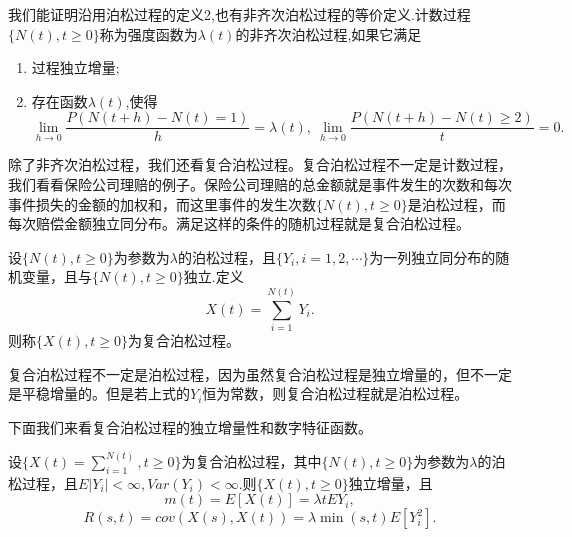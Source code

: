 \documentclass[lang=cn,10pt]{elegantbook}
\begin{document}
	\begin{definition}[非齐次泊松过程2]
		我们能证明沿用泊松过程的定义2,也有非齐次泊松过程的等价定义.计数过程\(\{N(t),t\ge0\}\)称为强度函数为\(\lambda(t)\)的非齐次泊松过程,如果它满足
		\begin{enumerate}
			\item 过程独立增量;
			\item 存在函数\(\lambda(t)\),使得
			\[\lim_{h\to 0}\frac{P(N(t+h)-N(t)=1)}{h}=\lambda(t),\ \lim_{h\to 0}\frac{P(N(t+h)-N(t)\ge 2)}{t}=0.\]
		\end{enumerate}
	\end{definition}
	除了非齐次泊松过程，我们还看复合泊松过程。复合泊松过程不一定是计数过程，我们看看保险公司理赔的例子。保险公司理赔的总金额就是事件发生的次数和每次事件损失的金额的加权和，而这里事件的发生次数\(\{N(t),t\ge 0\}\)是泊松过程，而每次赔偿金额独立同分布。满足这样的条件的随机过程就是复合泊松过程。
	\begin{definition}[复合泊松过程]
		设\(\{N(t),t\ge 0\}\)为参数为\(\lambda\)的泊松过程，且\(\{Y_i,i=1,2,\cdots\}\)为一列独立同分布的随机变量，且与\(\{N(t),t\ge 0\}\)独立.定义
		\[X(t)=\sum_{i=1}^{N(t)}Y_i.\]
		则称\(\{X(t),t\ge 0\}\)为复合泊松过程。
	\end{definition}
	\begin{note}
		复合泊松过程不一定是泊松过程，因为虽然复合泊松过程是独立增量的，但不一定是平稳增量的。但是若上式的\(Y_i\)恒为常数，则复合泊松过程就是泊松过程。
	\end{note}
	下面我们来看复合泊松过程的独立增量性和数字特征函数。
	\begin{theorem}
		设\(\{X(t)=\sum_{i=1}^{N(t)},t\ge 0\}\)为复合泊松过程，其中\(\{N(t),t\ge 0\}\)为参数为\(\lambda\)的泊松过程，且\(E|Y_i|<\infty,Var(Y_i)<\infty.\)则\(\{X(t),t\ge 0\}\)独立增量，且
		\[m(t)=E[X(t)]=\lambda tEY_i,\]
		\[R(s,t)=cov(X(s),X(t))=\lambda \min(s,t)E[Y_i^2].\]
	\end{theorem}
\end{document}
